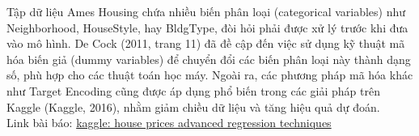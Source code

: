 Tập dữ liệu Ames Housing chứa nhiều biến phân loại (categorical variables) như Neighborhood, HouseStyle, hay BldgType, đòi hỏi phải được xử lý trước khi đưa vào mô hình. De Cock (2011, trang 11) đã đề cập đến việc sử dụng kỹ thuật mã hóa biến giả (dummy variables) để chuyển đổi các biến phân loại này thành dạng số, phù hợp cho các thuật toán học máy. Ngoài ra, các phương pháp mã hóa khác như Target Encoding cũng được áp dụng phổ biến trong các giải pháp trên Kaggle (Kaggle, 2016), nhằm giảm chiều dữ liệu và tăng hiệu quả dự đoán. \\
Link bài báo: \href{https://www.kaggle.com/competitions/house-prices-advanced-regression-techniques}{kaggle: house prices advanced regression techniques}